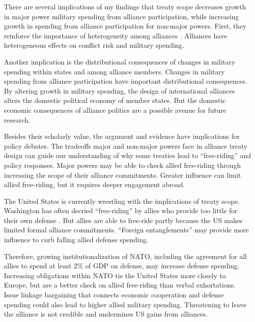\documentclass[12pt]{article}
\begin{document}
There are several implications of my findings that treaty scope decreases growth in major power military spending from alliance participation, while increasing growth in spending from alliance participation for non-major powers.  
First, they reinforce the importance of heterogeneity among alliances \citep{Leeds2003, Benson2012, DigiuseppePoast2016}.
Alliances have heterogeneous effects on conflict risk and military spending. 


Another implication is the distributional consequences of changes in military spending within states and among alliance members.  
Changes in military spending from alliance participation have important distributional consequences. 
By altering growth in military spending, the design of international alliances alters the domestic political economy of member states. 
But the domestic economic consequences of alliance politics are a possible avenue for future research. 


Besides their scholarly value, the argument and evidence have implications for policy debates. 
The tradeoffs major and non-major powers face in alliance treaty design can guide our understanding of why some treaties lead to ``free-riding'' and policy responses. 
Major powers may be able to check allied free-riding through increasing the scope of their alliance commitments. 
Greater influence can limit allied free-riding, but it requires deeper engagement abroad. 


The United States is currently wrestling with the implications of treaty scope. 
Washington has often decried ``free-riding'' by allies who provide too little for their own defense \citep{Lanoszka2015}. 
But allies are able to free-ride partly because the US makes limited formal alliance commitments. 
``Foreign entanglements'' may provide more influence to curb falling allied defense spending. 

 
Therefore, growing institutionalization of NATO, including the agreement for all allies to spend at least 2\% of GDP on defense, may increase defense spending.
Increasing obligations within NATO tie the United States more closely to Europe, but are a better check on allied free-riding than verbal exhortations. 
Issue linkage bargaining that connects economic cooperation and defense spending could also lead to higher allied military spending.
Threatening to leave the alliance is not credible and undermines US gains from alliances. 
\end{document}
